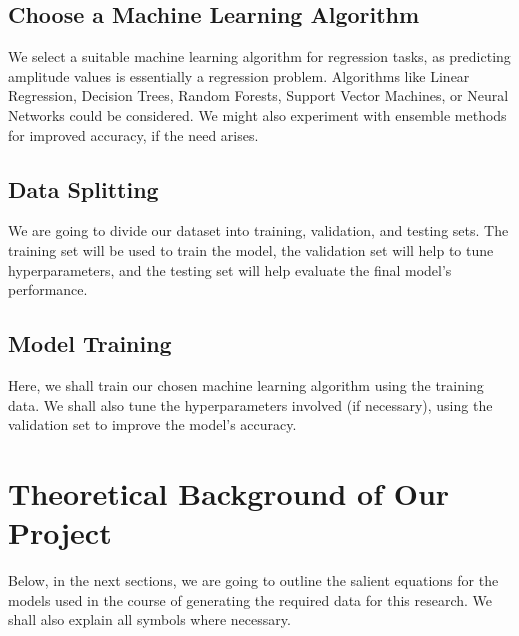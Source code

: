 \documentclass[conference]{IEEEtran}
\begin{document}
\subsection{Choose a Machine Learning Algorithm}
We select a suitable machine learning algorithm for regression tasks,
as predicting amplitude values is essentially a regression problem. Algorithms like Linear Regression, Decision
Trees, Random Forests, Support Vector Machines, or Neural Networks could be considered. We might also
experiment with ensemble methods for improved accuracy, if the need arises.
\subsection{Data Splitting}
We are going to divide our dataset into training, validation, and testing sets. The training set will be used to train the model, the validation set will help to tune hyperparameters, and the testing set will help evaluate the final model's performance.
\subsection{Model Training}
Here, we shall train our chosen machine learning algorithm using the training data. We shall
also tune the hyperparameters involved (if necessary), using the validation set to improve the model's accuracy.

\section{Theoretical Background of Our Project}
Below, in the next sections, we are going to outline the salient equations for the models used in the course of generating the required data for this research. We shall also explain all symbols where necessary. 

\end{document}

